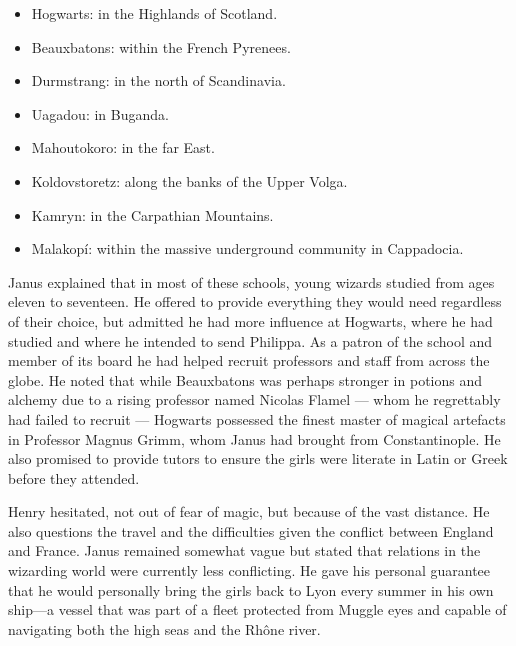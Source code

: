 \begin{itemize}
    \item {Hogwarts}: in the Highlands of Scotland.

    \item {Beauxbatons}: within the French Pyrenees.

    \item {Durmstrang}: in the north of Scandinavia.

    \item {Uagadou}: in Buganda.

    \item {Mahoutokoro}: in the far East.

    \item {Koldovstoretz}: along the banks of the Upper Volga.

    \item {Kamryn}: in the Carpathian Mountains.

    \item {Malakopí}: within the massive underground community in Cappadocia.
\end{itemize}

Janus explained that in most of these schools, young wizards studied from ages eleven to seventeen. He offered to provide everything they would need regardless of their choice, but admitted he had more influence at Hogwarts, where he had studied and where he intended to send Philippa. As a patron of the school and member of its board he had helped recruit professors and staff from across the globe. He noted that while Beauxbatons was perhaps stronger in potions and alchemy due to a rising professor named Nicolas Flamel --- whom he regrettably had failed to recruit --- Hogwarts possessed the finest master of magical artefacts in Professor Magnus Grimm, whom Janus had brought from Constantinople. He also promised to provide tutors to ensure the girls were literate in Latin or Greek before they attended.

Henry hesitated, not out of fear of magic, but because of the vast distance. He also questions the travel and the difficulties given the conflict between England and France. Janus remained somewhat vague but stated that relations in the wizarding world were currently less conflicting. He gave his personal guarantee that he would personally bring the girls back to Lyon every summer in his own ship---a vessel that was part of a fleet protected from Muggle eyes and capable of navigating both the high seas and the Rhône river.
